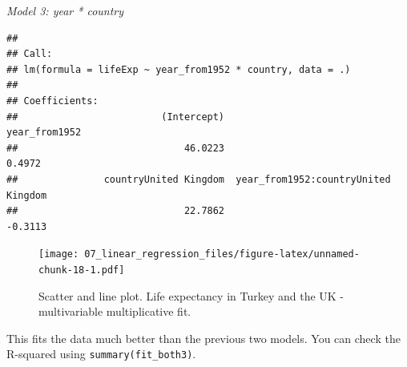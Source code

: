 \documentclass[
  12pt,
  krantz2]{krantz}
\makeatletter
\newenvironment{Shaded}{\begin{snugshade}}{\end{snugshade}}
\newcommand{\DataTypeTok}[1]{\textcolor[rgb]{0.13,0.29,0.53}{#1}}
\newcommand{\KeywordTok}[1]{\textcolor[rgb]{0.13,0.29,0.53}{\textbf{#1}}}
\newcommand{\NormalTok}[1]{#1}
\newcommand{\OperatorTok}[1]{\textcolor[rgb]{0.81,0.36,0.00}{\textbf{#1}}}
\newcommand{\StringTok}[1]{\textcolor[rgb]{0.31,0.60,0.02}{#1}}
\newenvironment{kframe}{%
\medskip{}
\setlength{\fboxsep}{.8em}
 \def\at@end@of@kframe{}%
 \ifinner\ifhmode%
  \def\at@end@of@kframe{\end{minipage}}%
  \begin{minipage}{\columnwidth}%
 \fi\fi%
 \def\FrameCommand##1{\hskip\@totalleftmargin \hskip-\fboxsep
 \colorbox{shadecolor}{##1}\hskip-\fboxsep
     \hskip-\linewidth \hskip-\@totalleftmargin \hskip\columnwidth}%
 \MakeFramed {\advance\hsize-\width
   \@totalleftmargin\z@ \linewidth\hsize
   \@setminipage}}%
 {\par\unskip\endMakeFramed%
 \at@end@of@kframe}
\renewenvironment{Shaded}{\begin{kframe}}{\end{kframe}}
\makeatother
\begin{document}
\emph{Model 3: year * country}

\begin{Shaded}
\end{Shaded}

\begin{verbatim}
## 
## Call:
## lm(formula = lifeExp ~ year_from1952 * country, data = .)
## 
## Coefficients:
##                         (Intercept)                        year_from1952  
##                             46.0223                               0.4972  
##               countryUnited Kingdom  year_from1952:countryUnited Kingdom  
##                             22.7862                              -0.3113
\end{verbatim}

\begin{Shaded}
\end{Shaded}

\begin{figure}
\centering
\texttt{[image: 07\_linear\_regression\_files/figure-latex/unnamed-chunk-18-1.pdf]}
\caption{\label{fig:unnamed-chunk-18}Scatter and line plot. Life expectancy in Turkey and the UK - multivariable multiplicative fit.}
\end{figure}

This fits the data much better than the previous two models.
You can check the R-squared using \texttt{summary(fit\_both3)}.
\end{document}
